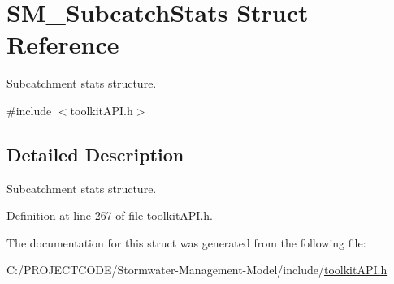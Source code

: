 \hypertarget{struct_s_m___subcatch_stats}{}\section{S\+M\+\_\+\+Subcatch\+Stats Struct Reference}
\label{struct_s_m___subcatch_stats}


Subcatchment stats structure.  




{\ttfamily \#include $<$toolkit\+A\+P\+I.\+h$>$}



\subsection{Detailed Description}
Subcatchment stats structure. 

Definition at line 267 of file toolkit\+A\+P\+I.\+h.



The documentation for this struct was generated from the following file\+:\begin{DoxyCompactItemize}
\item 
C\+:/\+P\+R\+O\+J\+E\+C\+T\+C\+O\+D\+E/\+Stormwater-\/\+Management-\/\+Model/include/\hyperlink{toolkit_a_p_i_8h}{toolkit\+A\+P\+I.\+h}\end{DoxyCompactItemize}
